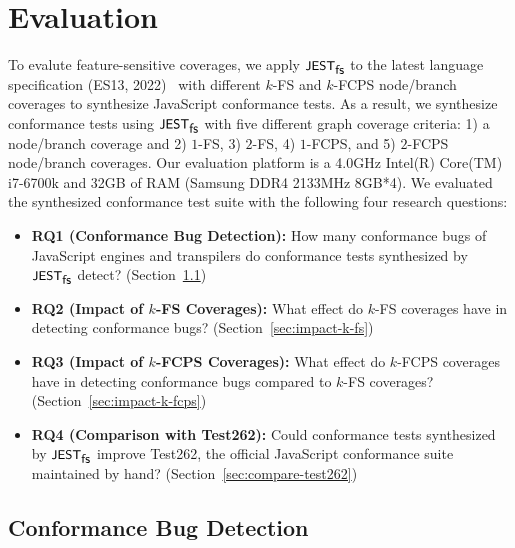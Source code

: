 \section{Evaluation}\label{sec:eval}

To evalute feature-sensitive coverages, we apply $\textsf{\small JEST}_{\textsf{\small fs}}$ to the latest language
specification (ES13, 2022)~\cite{es13} with different $k$-FS and $k$-FCPS
node/branch coverages to synthesize JavaScript conformance tests.
%
As a result, we synthesize  conformance tests using $\textsf{\small JEST}_{\textsf{\small fs}}$ with
five different graph coverage criteria: 1) a node/branch coverage and 2)
$1$-FS, 3) $2$-FS, 4) $1$-FCPS, and 5) $2$-FCPS node/branch coverages.
%
Our evaluation platform is a 4.0GHz Intel(R) Core(TM) i7-6700k and 32GB of RAM
(Samsung DDR4 2133MHz 8GB*4).
%
We evaluated the synthesized conformance test suite with the following four
research questions:
\begin{itemize}
  \item \textbf{RQ1 (Conformance Bug Detection):} How many conformance bugs of
    JavaScript engines and transpilers do conformance tests synthesized by
    $\textsf{\small JEST}_{\textsf{\small fs}}$ detect? (Section~\ref{sec:conform-bug})
  \item \textbf{RQ2 (Impact of $k$-FS Coverages):} What effect do $k$-FS
    coverages have in detecting conformance bugs?
    (Section~\ref{sec:impact-k-fs})
  \item \textbf{RQ3 (Impact of $k$-FCPS Coverages):} What effect do $k$-FCPS
    coverages have in detecting conformance bugs compared to $k$-FS coverages?
    (Section~\ref{sec:impact-k-fcps})
  \item \textbf{RQ4 (Comparison with Test262):} Could conformance tests
    synthesized by $\textsf{\small JEST}_{\textsf{\small fs}}$ improve Test262, the official JavaScript conformance
    suite maintained by hand? (Section~\ref{sec:compare-test262})
\end{itemize}


\subsection{Conformance Bug Detection}\label{sec:conform-bug}

